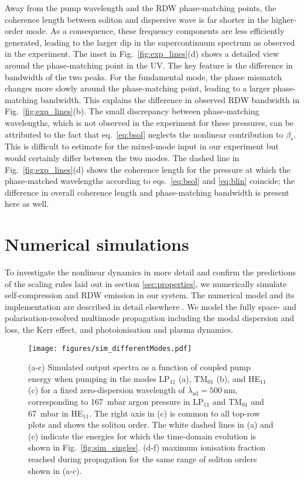 \documentclass[amsmath, preprint, floatfix]{revtex4-2}
\begin{document}
Away from the pump wavelength and the RDW phase-matching points, the coherence length between soliton and dispersive wave is far shorter in the higher-order mode. As a consequence, these frequency components are less efficiently generated, leading to the larger dip in the supercontinuum spectrum as observed in the experiment. The inset in Fig.~\ref{fig:exp_lines}(d) shows a detailed view around the phase-matching point in the UV. The key feature is the difference in bandwidth of the two peaks. For the fundamental mode, the phase mismatch changes more slowly around the phase-matching point, leading to a larger phase-matching bandwidth. This explains the difference in observed RDW bandwidth in Fig.~\ref{fig:exp_lines}(b). The small discrepancy between phase-matching wavelengths, which is not observed in the experiment for these pressures, can be attributed to the fact that eq.~\ref{eq:bsol} neglects the nonlinear contribution to $\beta_\mathrm{s}$. This is difficult to estimate for the mixed-mode input in our experiment but would certainly differ between the two modes. The dashed line in Fig.~\ref{fig:exp_lines}(d) shows the coherence length for the pressure at which the phase-matched wavelengths according to eqs.~\ref{eq:bsol} and \ref{eq:blin} coincide; the difference in overall coherence length and phase-matching bandwidth is present here as well.

\section{Numerical simulations}
To investigate the nonlinear dynamics in more detail and confirm the predictions of the scaling rules laid out in section \ref{sec:properties}, we numerically simulate self-compression and RDW emission in our system. The numerical model and its implementation are described in detail elsewhere \cite{brahms_lunajl_2021,travers_high-energy_2019}. We model the fully space- and polarisation-resolved multimode propagation including the modal dispersion and loss, the Kerr effect, and photoionisation and plasma dynamics.

\begin{figure}
    \centering
    \texttt{[image: figures/sim\_differentModes.pdf]}
    \caption{(a-c) Simulated output spectra as a function of coupled pump energy when pumping in the modes LP$_{11}$ (a), TM$_{01}$ (b), and HE$_{11}$ (c) for a fixed zero-dispersion wavelength of $\lambda_\mathrm{zd}=\SI{500}{\nm}$, corresponding to \SI{167}{\milli\bar} argon pressure in LP$_{11}$ and TM$_{01}$ and \SI{67}{\milli\bar} in HE$_{11}$. The right axis in (c) is common to all top-row plots and shows the soliton order. The white dashed lines in (a) and (c) indicate the energies for which the time-domain evolution is shown in Fig.~\ref{fig:sim_singles}. (d-f) maximum ionisation fraction reached during propagation for the same range of soliton orders shown in (a-c).}
    \label{fig:sim_differentModes}
\end{figure}
\end{document}
